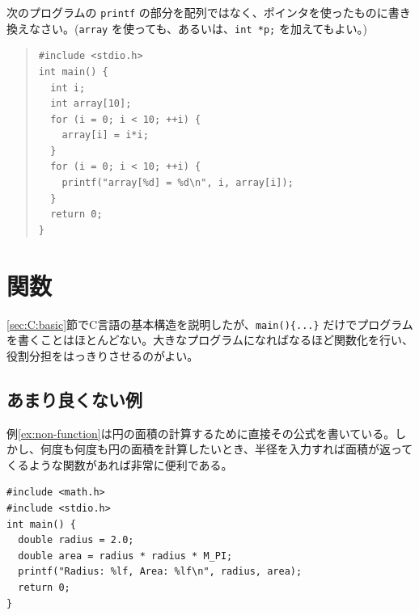 \begin{renshuu}\label{prob:5-1}
次のプログラムの \verb|printf| の部分を配列ではなく、ポインタを使ったものに書き換えなさい。(\verb|array| を使っても、あるいは、\verb|int *p;| を加えてもよい。)

\begin{quote}
\begin{verbatim}
#include <stdio.h>
int main() {
  int i;
  int array[10];
  for (i = 0; i < 10; ++i) {
    array[i] = i*i;
  }
  for (i = 0; i < 10; ++i) {
    printf("array[%d] = %d\n", i, array[i]);
  }
  return 0;
}
\end{verbatim}
\end{quote}
\end{renshuu}

\section{関数}
\label{sec:C:function}

\ref{sec:C:basic}節でC言語の基本構造を説明したが、\verb|main(){...}| だけでプログラムを書くことはほとんどない。大きなプログラムになればなるほど関数化を行い、役割分担をはっきりさせるのがよい。

\subsection{あまり良くない例}
例\ref{ex:non-function}は円の面積の計算するために直接その公式を書いている。しかし、何度も何度も円の面積を計算したいとき、半径を入力すれば面積が返ってくるような関数があれば非常に便利である。
%
\begin{reidai}\label{ex:non-function}
\begin{verbatim}
#include <math.h>
#include <stdio.h>
int main() {
  double radius = 2.0;
  double area = radius * radius * M_PI;
  printf("Radius: %lf, Area: %lf\n", radius, area);
  return 0;
}
\end{verbatim}
\end{reidai}
%

